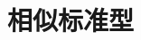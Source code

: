 \documentclass[../main.tex]{subfiles} %
\begin{document}
\chapter{相似标准型}



% 

% 

% 

% 

% 

% 

% 

% 

% 
\end{document}
